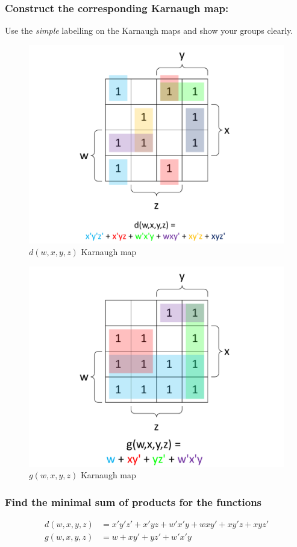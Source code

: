 \documentclass[12pt,a4paper]{article}
\begin{document}
\newpage
\subsubsection{Construct the corresponding Karnaugh map:}
Use the \emph{simple} labelling on the Karnaugh maps and show your groups clearly.

\begin{figure}[h]
\centering
\caption{$d(w,x,y,z)$ Karnaugh map}
\includegraphics[scale=0.56]{./../img/q5-2_d.pdf}
\end{figure}

\begin{figure}[h]
\centering
\caption{$g(w,x,y,z)$ Karnaugh map}
\includegraphics[scale=0.56]{./../img/q5-2_g.pdf}
\end{figure}

\subsubsection{Find the minimal sum of products for the functions}
\begin{align*}
d(w,x,y,z) &= x'y'z' + x'yz + w'x'y + wxy' + xy'z + xyz' \\
g(w,x,y,z) &= w + xy' + yz' + w'x'y
\end{align*}
\end{document}

